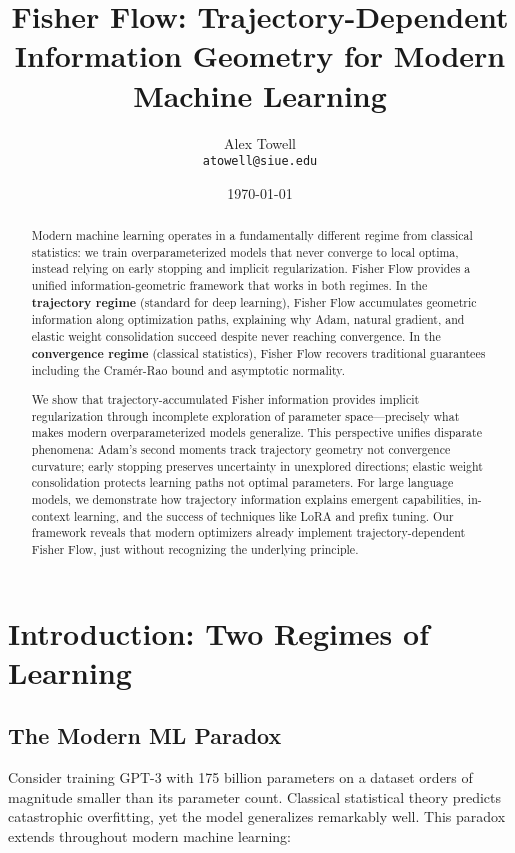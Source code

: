 \documentclass[11pt]{article}
\title{Fisher Flow: Trajectory-Dependent Information Geometry for Modern Machine Learning}
\author{Alex Towell \\ \texttt{atowell@siue.edu}}
\date{\today}
\begin{document}
\maketitle

\begin{abstract}
Modern machine learning operates in a fundamentally different regime from classical statistics: we train overparameterized models that never converge to local optima, instead relying on early stopping and implicit regularization. Fisher Flow provides a unified information-geometric framework that works in both regimes. In the \textbf{trajectory regime} (standard for deep learning), Fisher Flow accumulates geometric information along optimization paths, explaining why Adam, natural gradient, and elastic weight consolidation succeed despite never reaching convergence. In the \textbf{convergence regime} (classical statistics), Fisher Flow recovers traditional guarantees including the Cramér-Rao bound and asymptotic normality. 

We show that trajectory-accumulated Fisher information provides implicit regularization through incomplete exploration of parameter space—precisely what makes modern overparameterized models generalize. This perspective unifies disparate phenomena: Adam's second moments track trajectory geometry not convergence curvature; early stopping preserves uncertainty in unexplored directions; elastic weight consolidation protects learning paths not optimal parameters. For large language models, we demonstrate how trajectory information explains emergent capabilities, in-context learning, and the success of techniques like LoRA and prefix tuning. Our framework reveals that modern optimizers already implement trajectory-dependent Fisher Flow, just without recognizing the underlying principle.
\end{abstract}

\section{Introduction: Two Regimes of Learning}

\subsection{The Modern ML Paradox}

Consider training GPT-3 with 175 billion parameters on a dataset orders of magnitude smaller than its parameter count. Classical statistical theory predicts catastrophic overfitting, yet the model generalizes remarkably well. This paradox extends throughout modern machine learning:
\end{document}
